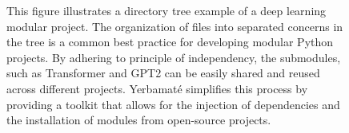 






\begin{figure}
\centering
{}
\caption{
This figure illustrates a directory tree example of a deep learning modular project. The organization of files into separated concerns in the tree is a common best practice for developing modular Python projects. By adhering to principle of independency, the submodules, such as Transformer and GPT2 can be easily shared and reused across different projects. Yerbamaté simplifies this process by providing a toolkit that allows for the injection of dependencies and the installation of modules from open-source projects.
}
\end{figure}



